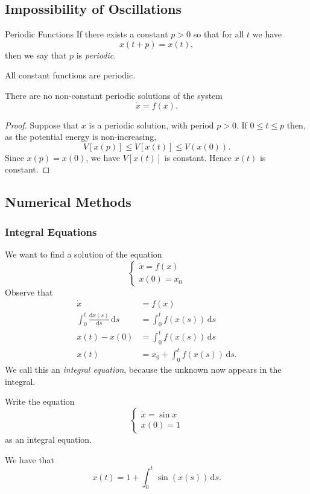 \documentclass[class=article, crop=false]{standalone}
\begin{document}
  \subsection{Impossibility of Oscillations}
  \begin{definition}{Periodic Functions}
    If there exists a constant $p > 0$ so that for all $t$ we have
    \[
      x(t + p) = x(t),
    \]
    then we say that $p$ is \emph{periodic}.
  \end{definition}
  \begin{note}{}
    All constant functions are periodic.
  \end{note}
  \begin{theorem}{}
    There are no non-constant periodic solutions of the system
    \[
      \dot{x} = f(x).
    \]
    \begin{proof}
      Suppose that $x$ is a periodic solution, with period $p > 0$. If $0 \leq t \leq p$ then, as the potential energy is non-increasing,
      \[
        V[x(p)] \leq V[x(t)] \leq V(x(0)).
      \]
      Since $x(p) = x(0)$, we have $V[x(t)]$ is constant. Hence $x(t)$ is constant.
    \end{proof}
  \end{theorem}
  \subsection{Numerical Methods}
  \subsubsection{Integral Equations}
  We want to find a solution of the equation 
  \[
    \begin{cases}
      \dot{x} = f(x) \\
      x(0) = x_0
    \end{cases}
  \]
  Observe that
  \begin{align*}
    \dot{x} &= f(x) \\
    \int_{0}^{t} \frac{\mathrm{d}x(s)}{\mathrm{d}s} \,\mathrm ds &= \int_{0}^{t}f(x(s)) \,\mathrm ds \\
    x(t) - x(0) &= \int_{0}^{t} f(x(s)) \,\mathrm ds \\
    x(t) &= x_0 + \int_{0}^{t}f(x(s)) \,\mathrm ds.
  \end{align*}
  We call this an \emph{integral equation}, because the unknown now appears in the integral.
  \begin{example}{}
    Write the equation 
    \[
      \begin{cases}
        \dot{x} = \sin x \\
        x(0) = 1
      \end{cases}
    \]
    as an integral equation. \par
    We have that
    \[
      x(t) = 1 + \int_{0}^{t}\sin(x(s)) \,\mathrm ds.
    \]
  \end{example}
\end{document}

